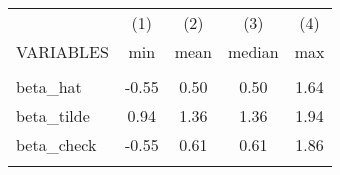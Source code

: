 \documentclass[]{article}
\begin{document}
\begin{tabular}{lcccc} \hline
 & (1) & (2) & (3) & (4) \\
VARIABLES & min & mean & median & max \\ \hline
 &  &  &  &  \\
beta\_hat & -0.55 & 0.50 & 0.50 & 1.64 \\
beta\_tilde & 0.94 & 1.36 & 1.36 & 1.94 \\
beta\_check & -0.55 & 0.61 & 0.61 & 1.86 \\
 &  &  &  &  \\ \hline
\end{tabular}
\end{document}
